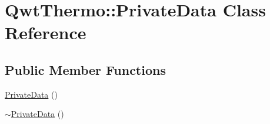 \hypertarget{class_qwt_thermo_1_1_private_data}{\section{Qwt\-Thermo\-:\-:Private\-Data Class Reference}
\label{class_qwt_thermo_1_1_private_data}
}
\subsection*{Public Member Functions}
\begin{DoxyCompactItemize}
\item 
\hyperlink{class_qwt_thermo_1_1_private_data_aab29828965899e842893b71006591258}{Private\-Data} ()
\item 
\hyperlink{class_qwt_thermo_1_1_private_data_a12f823f192f054aace19a5ac377a40db}{$\sim$\-Private\-Data} ()
\end{DoxyCompactItemize}

